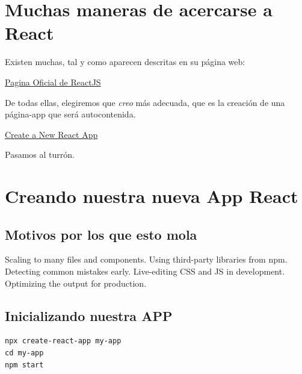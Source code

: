 \documentclass[11pt]{article}
\begin{document}
\section{Muchas maneras de acercarse a React}
\label{sec:org2d5f14b}

Existen muchas, tal y como aparecen descritas en su página web:

\href{https://reactjs.org/}{Pagina Oficial de ReactJS}

De todas ellas, elegiremos que \emph{creo} más adecuada, que es la creación de una
página-app que será autocontenida.

\href{https://reactjs.org/docs/create-a-new-react-app.html}{Create a New React App}

Pasamos al turrón.

\section{Creando nuestra nueva App React}
\label{sec:org6778707}

\subsection{Motivos por los que esto mola}
\label{sec:orga299c1c}

Scaling to many files and components.
Using third-party libraries from npm.
Detecting common mistakes early.
Live-editing CSS and JS in development.
Optimizing the output for production.







\subsection{Inicializando nuestra APP}
\label{sec:orgc319e5e}

\begin{verbatim}
npx create-react-app my-app
cd my-app
npm start
\end{verbatim}
\end{document}
